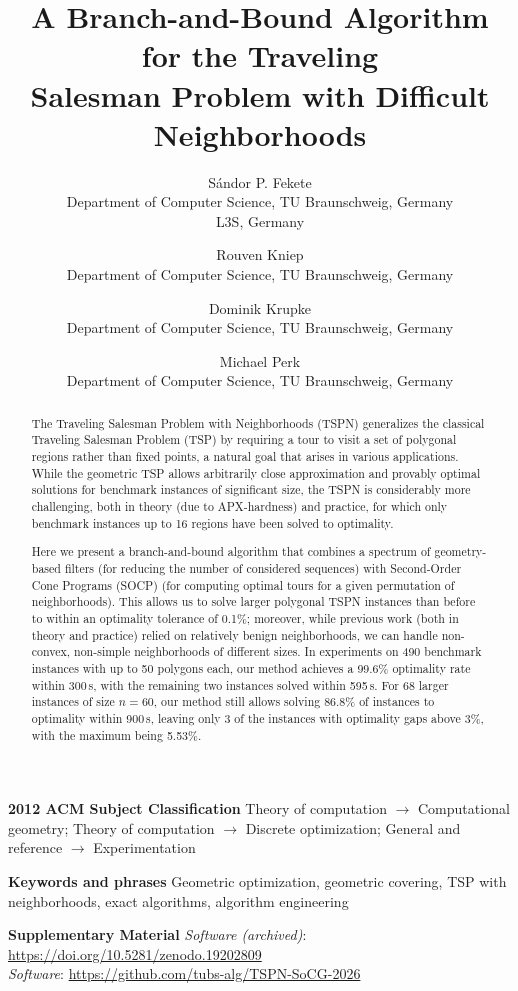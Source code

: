 \documentclass[11pt,a4paper]{article}
\title{\textbf{A Branch-and-Bound Algorithm for the Traveling\\ Salesman Problem with Difficult Neighborhoods}}
\author{
	Sándor P. Fekete \\ \small Department of Computer Science, TU Braunschweig, Germany \\ \small L3S, Germany
	\and
	Rouven Kniep \\ \small Department of Computer Science, TU Braunschweig, Germany
	\and
	Dominik Krupke \\ \small Department of Computer Science, TU Braunschweig, Germany
	\and
	Michael Perk \\ \small Department of Computer Science, TU Braunschweig, Germany
}
\date{}
\theoremstyle{plain}
\begin{document}
\maketitle

\begin{abstract}
The Traveling Salesman Problem with Neighborhoods (TSPN) generalizes the classical Traveling Salesman Problem (TSP) by requiring a tour to visit a set of polygonal regions rather than fixed points, a natural goal that arises in various applications. While the geometric TSP allows arbitrarily close approximation and provably optimal solutions for benchmark instances of significant size, the TSPN is considerably more challenging, both in theory (due to APX-hardness) and practice, for which only benchmark instances up to 16 regions have been solved to optimality.

Here we present a branch-and-bound algorithm that combines a spectrum of geometry-based filters (for reducing the number of considered sequences) with Second-Order Cone Programs (SOCP) (for computing optimal tours for a given permutation of neighborhoods). This allows us to solve larger polygonal TSPN instances than before to within an optimality tolerance of 0.1\%; moreover, while previous work (both in theory and practice) relied on relatively benign neighborhoods, we can handle non-convex, non-simple neighborhoods of different sizes. In experiments on 490 benchmark instances with up to 50 polygons each, our method achieves a 99.6\% optimality rate within 300\,s, with the remaining two instances solved within 595\,s. For 68 larger instances of size $n = 60$, our method still allows solving 86.8\% of instances to optimality within 900\,s, leaving only 3 of the instances with optimality gaps above 3\%, with the maximum being 5.53\%.
\end{abstract}

\noindent\textbf{2012 ACM Subject Classification} Theory of computation $\to$ Computational geometry; Theory of computation $\to$ Discrete optimization; General and reference $\to$ Experimentation

\noindent\textbf{Keywords and phrases} Geometric optimization, geometric covering, TSP with neighborhoods, exact algorithms, algorithm engineering

\noindent\textbf{Supplementary Material} \emph{Software (archived)}: \url{https://doi.org/10.5281/zenodo.19202809}\\
\emph{Software}: \url{https://github.com/tubs-alg/TSPN-SoCG-2026}
\end{document}
